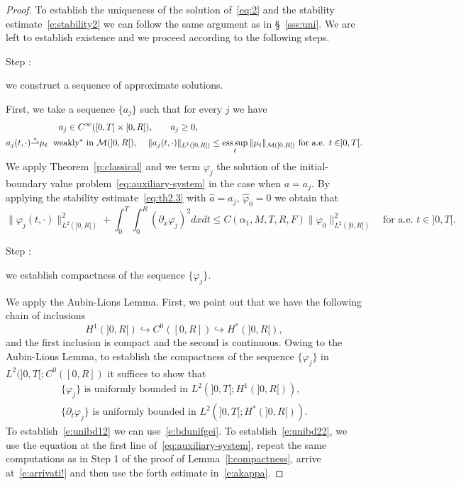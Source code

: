 \documentclass[11pt,leqno]{amsart}
\newcounter{stepnb}
\numberwithin{equation}{section}
\begin{document}
\begin{proof}
To establish the uniqueness of the solution of~\eqref{eq:2} and the stability estimate~\eqref{e:stability2} we can follow the same argument as in \S~\ref{sss:uni}.
We are left to establish existence and we proceed according to the following steps. \\
{\setcounter{stepnb}{0}}
{{{\sc \addtocounter{stepnb}{1}\noindent  Step :} {we construct a sequence of approximate solutions}.}} First, we take
a sequence $\{ a_j \}$ such that for every $j$ we have 
\begin{equation}
  \label{e:akappa}
  \begin{split}
    & \qquad \qquad \qquad a_j \in C^\infty ([0, T] \times [0, R]),
    \qquad a_j \ge 0, 
    \\ 
    & a_j (t, \cdot) {\stackrel{*}{\rightharpoonup}} \mu_t \; \text{
      weakly$^\ast$ in $\mathcal M (]0, R[)$, \quad $\| a_j (t, \cdot)
      \|_{L^1 (]0, R[)} \leq \operatorname*{ess\,sup}_t \| \mu_t \|_{\mathcal M(]0,
        R[)}$ for a.e. $t \in ]0, T[$}.
  \end{split}
\end{equation}
We apply Theorem~\ref{p:classical} and we term ${\varphi}_j$ the solution of the initial-boundary value problem~\eqref{eq:auxiliary-system} in the case when $a=a_j$.  By applying the stability estimate~\eqref{eq:th2.3} with 
$\hat a = a_j$, $\hat {\varphi}_0 =0$ we obtain that
\begin{equation}
\label{e:bdunifgei}
  \| {\varphi}_j (t, \cdot)\|^2_{L^2 (]0, R[)}
  + \int_0^T \int_0^R ({\partial_x } {\varphi}_j )^2 dx dt \leq 
  C(\alpha_1, M, T, R, F)  \| {\varphi}_0 \|^2_{L^2 (]0, R[)}
  \quad \text{for a.e. $t \in ]0, T[$}. 
\end{equation}
{{{\sc \addtocounter{stepnb}{1}\noindent  Step :} {we establish compactness of the sequence $\{ {\varphi}_j \}$}.}} We apply the Aubin-Lions Lemma. First, we point out  that 
we have the following chain of inclusions 
$$
    H^1 (]0, R[) \hookrightarrow C^0 ([0, R]) \hookrightarrow H^\ast (]0, R[), 
$$ 
and the first inclusion is compact and the second is continuous. Owing to the Aubin-Lions Lemma, to establish the compactness of the sequence $\{ {\varphi}_j \}$ in $L^2 (]0, T[; C^0 ([0, R])$ it suffices to show that
\begin{eqnarray}
     \text{$\{ {\varphi}_j \}$ is uniformly bounded in $L^2 (]0, T[; H^1(]0, R[))$}, 
     \label{e:unibd12}
     \\
     \text{$\{ {\partial_t} {\varphi}_j \}$ is uniformly bounded in $L^2 (]0, T[; H^\ast (]0, R[))$}.
     \label{e:unibd22}  
\end{eqnarray} 
To establish~\eqref{e:unibd12} we can use~\eqref{e:bdunifgei}. To establish~\eqref{e:unibd22}, we use the equation at the first line 
of~\eqref{eq:auxiliary-system}, repeat the same computations as in {\sc Step 1}  of the proof of Lemma~\ref{l:compactness}, arrive at~\eqref{e:arrivati!} and then use the forth estimate in~\eqref{e:akappa}. 


\end{proof}
\end{document}
